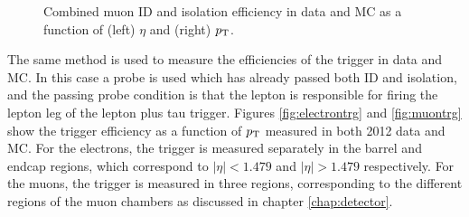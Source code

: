 \begin{figure}[htb]
\caption{Combined muon ID and isolation efficiency in data and MC as a function
of (left) $\eta$ and (right) $p_{\mathrm{T}}$.}
\label{fig:muonIdIso}
\end{figure}

The same method is used to measure the efficiencies of the trigger
in data and MC. In this case a probe is used which has already passed both ID
and isolation, and the passing probe condition is that the lepton is responsible
for firing the lepton leg of the lepton plus tau trigger. Figures
\ref{fig:electrontrg} and \ref{fig:muontrg} show the trigger efficiency as a
function of $p_{\mathrm{T}}$ measured in both 2012 data and \ac{MC}. For the
electrons, the trigger is measured separately in the barrel and endcap
regions, which correspond to $|\eta| < 1.479$ and $|\eta| > 1.479$
respectively. For the muons, the trigger is measured in three regions, corresponding
to the different regions of the muon chambers as discussed in chapter
\ref{chap:detector}.

